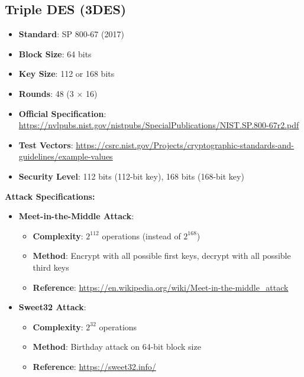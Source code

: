 \documentclass[11pt,a4paper]{article}
\begin{document}
\subsection{Triple DES (3DES)}
\begin{itemize}
    \item \textbf{Standard}: SP 800-67 (2017)
    \item \textbf{Block Size}: 64 bits
    \item \textbf{Key Size}: 112 or 168 bits
    \item \textbf{Rounds}: 48 (3 × 16)
    \item \textbf{Official Specification}: \url{https://nvlpubs.nist.gov/nistpubs/SpecialPublications/NIST.SP.800-67r2.pdf}
    \item \textbf{Test Vectors}: \url{https://csrc.nist.gov/Projects/cryptographic-standards-and-guidelines/example-values}
    \item \textbf{Security Level}: 112 bits (112-bit key), 168 bits (168-bit key)
\end{itemize}

\textbf{Attack Specifications:}
\begin{itemize}
    \item \textbf{Meet-in-the-Middle Attack}: 
    \begin{itemize}
        \item \textbf{Complexity}: $2^{112}$ operations (instead of $2^{168}$)
        \item \textbf{Method}: Encrypt with all possible first keys, decrypt with all possible third keys
        \item \textbf{Reference}: \url{https://en.wikipedia.org/wiki/Meet-in-the-middle_attack}
    \end{itemize}
    \item \textbf{Sweet32 Attack}: 
    \begin{itemize}
        \item \textbf{Complexity}: $2^{32}$ operations
        \item \textbf{Method}: Birthday attack on 64-bit block size
        \item \textbf{Reference}: \url{https://sweet32.info/}
    \end{itemize}
\end{itemize}
\end{document}
